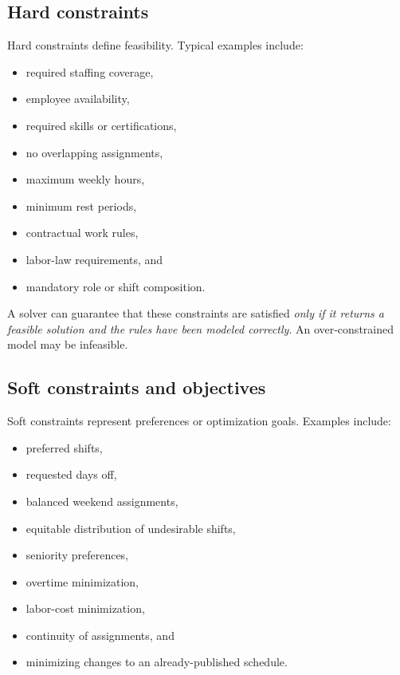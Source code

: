\documentclass[11pt]{article}
\begin{document}
\subsection{Hard constraints}

Hard constraints define feasibility. Typical examples include:

\begin{itemize}
  \item required staffing coverage,
  \item employee availability,
  \item required skills or certifications,
  \item no overlapping assignments,
  \item maximum weekly hours,
  \item minimum rest periods,
  \item contractual work rules,
  \item labor-law requirements, and
  \item mandatory role or shift composition.
\end{itemize}

A solver can guarantee that these constraints are satisfied \emph{only if it returns a feasible solution and the rules have been modeled correctly}. An over-constrained model may be infeasible.

\subsection{Soft constraints and objectives}

Soft constraints represent preferences or optimization goals. Examples include:

\begin{itemize}
  \item preferred shifts,
  \item requested days off,
  \item balanced weekend assignments,
  \item equitable distribution of undesirable shifts,
  \item seniority preferences,
  \item overtime minimization,
  \item labor-cost minimization,
  \item continuity of assignments, and
  \item minimizing changes to an already-published schedule.
\end{itemize}
\end{document}

